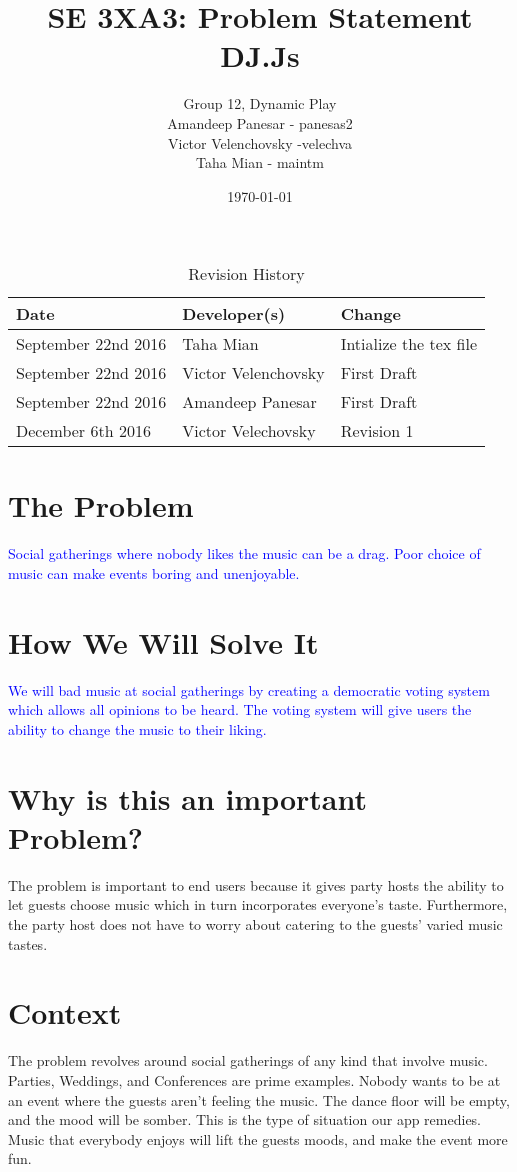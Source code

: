 \documentclass[11pt,fleqn]{article}
\title{SE 3XA3: Problem Statement\\DJ.Js}
\author{Group 12, Dynamic Play\\
Amandeep Panesar - panesas2 \\ Victor Velenchovsky -velechva \\ Taha Mian - maintm}
\date{\today}
\begin{document}
\begin{table}[hp]
\caption{Revision History} \label{TblRevisionHistory}
\begin{tabularx}{\textwidth}{llX}
\toprule
\textbf{Date} & \textbf{Developer(s)} & \textbf{Change}\\
\midrule
September 22nd 2016 & Taha Mian & Intialize the tex file\\
September 22nd 2016 & Victor Velenchovsky & First Draft\\
September 22nd 2016 & Amandeep Panesar & First Draft\\
December  6th  2016 & Victor Velechovsky & Revision 1\\
\bottomrule
\end{tabularx}
\end{table}
\maketitle

\section{The Problem}

\textcolor{blue}{
Social gatherings where nobody likes the music can be a drag. Poor choice of music can make events boring and unenjoyable.
}

\section{How We Will Solve It}
\textcolor{blue} {
We will bad music at social gatherings by creating a democratic voting system which allows all opinions to be heard. The voting system will give users the ability to change the music to their liking.
}

\section{Why is this an important Problem?}
The problem is important to end users because it gives party hosts the ability
to let guests choose music which in turn incorporates everyone's taste.
Furthermore, the party host does not have to worry about catering to the guests' varied music tastes.

\section{Context}
The problem revolves around social gatherings of any kind that involve music.
Parties, Weddings, and Conferences are prime examples. Nobody wants to be at an
event where the guests aren't feeling the music. The dance floor will be
empty, and the mood will be somber. This is the type of situation our app
remedies. Music that everybody enjoys will lift the guests moods, and make
the event more fun.
\end{document}
